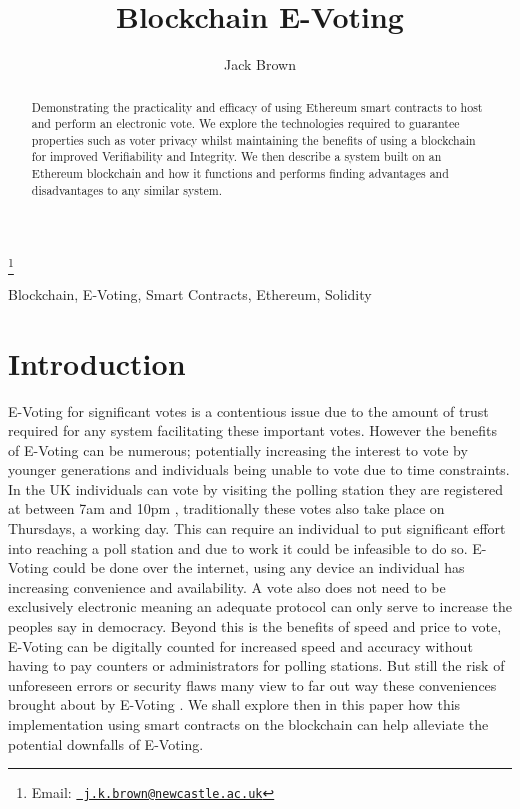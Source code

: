 \documentclass{entcs}
\begin{document}
\begin{frontmatter}

\title{Blockchain E-Voting}
\author{Jack Brown}
\address{School of Computing Science, Newcastle University, UK} 

\thanks{Email:
    \href{mailto:j.k.brown@newcastle.ac.uk} {\texttt{\normalshape
        j.k.brown@newcastle.ac.uk}}}

\begin{abstract} 
Demonstrating the practicality and efficacy of using Ethereum smart contracts to host and perform an electronic vote. We explore the technologies required to guarantee properties such as voter privacy whilst maintaining the benefits of using a blockchain for improved Verifiability and Integrity. We then describe a system built on an Ethereum blockchain and how it functions and performs finding advantages and disadvantages to any similar system.
\end{abstract}

\begin{keyword}
Blockchain, E-Voting, Smart Contracts, Ethereum, Solidity
\end{keyword}

\end{frontmatter}

\section{Introduction}
E-Voting for significant votes is a contentious issue due to the amount of trust required for any system facilitating these important votes. However the benefits of E-Voting can be numerous; potentially increasing the interest to vote by younger generations and individuals being unable to vote due to time constraints. In the UK individuals can vote by visiting the polling station they are registered at between 7am and 10pm \cite{pollStations}, traditionally these votes also take place on Thursdays, a working day. This can require an individual to put significant effort into reaching a poll station and due to work it could be infeasible to do so. E-Voting could be done over the internet, using any device an individual has increasing convenience and availability. A vote also does not need to be exclusively electronic meaning an adequate protocol can only serve to increase the peoples say in democracy. Beyond this is the benefits of speed and price to vote, E-Voting can be digitally counted for increased speed and accuracy without having to pay counters or administrators for polling stations. But still the risk of unforeseen errors or security flaws many view to far out way these conveniences brought about by E-Voting \cite{lauer2004risk}. We shall explore then in this paper how this implementation using smart contracts on the blockchain can help alleviate the potential downfalls of E-Voting.
\end{document}
